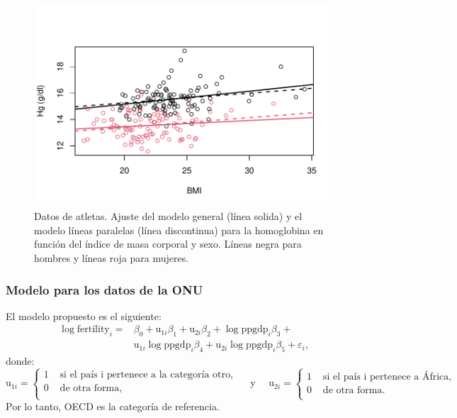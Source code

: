 \documentclass[
]{article}
\begin{document}
\begin{figure}

{\centering \includegraphics{MLG2_files/figure-latex/AtletesAjuste2-1} 

}

\caption{Datos de atletas. Ajuste del modelo general (línea solida) y el modelo líneas paralelas (línea discontinua) para la homoglobina en función  del índice de masa corporal y sexo. Líneas negra para hombres y líneas roja para mujeres.}\label{fig:AtletesAjuste2}
\end{figure}

\hypertarget{modelo-para-los-datos-de-la-onu}{%
\subsubsection{Modelo para los datos de la ONU}\label{modelo-para-los-datos-de-la-onu}}

El modelo propuesto es el siguiente:
\begin{equation}
\begin{split}
\log\mbox{fertility}_{i} =& \beta_{0} + \mbox{u}_{1i}\beta_{1}+\mbox{u}_{2i}\beta_{2} + \log\mbox{ppgdp}_{i}\beta_{3} + \\ & \mbox{u}_{1i}\log\mbox{ppgdp}_{i}\beta_{4} + \mbox{u}_{2i}\log\mbox{ppgdp}_{i}\beta_{5} + \varepsilon_{i},
\end{split}
\nonumber
\end{equation}
donde:
\[
\mbox{u}_{1i} = \begin{cases}
1 & \mbox{ si el país i pertenece a la categoría otro}, \\
0 & \mbox{ de otra forma}, \\
\end{cases} \quad \mbox{ y } \quad 
\mbox{u}_{2i} = \begin{cases}
1 & \mbox{ si el país i pertenece a África}, \\
0 & \mbox{ de otra forma}. \\
\end{cases}
\]
Por lo tanto, OECD es la categoría de referencia.
\end{document}
